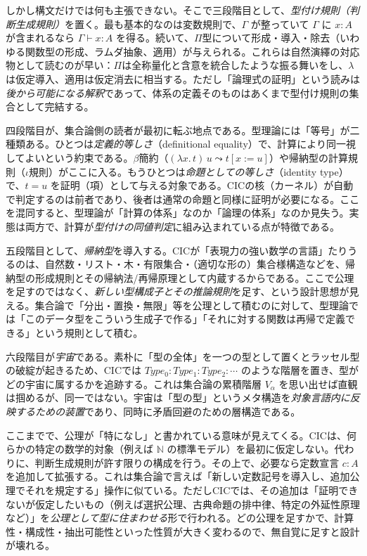 \documentclass[a4paper,12pt]{bxjsbook}
\newlength{\customindent}
\newenvironment{body}{
  \par
  \begingroup
  \setlength{\leftskip}{\customindent}
  \setlength{\rightskip}{0pt}
  \setlength{\parindent}{1em}
  \setlength{\displayindent}{\customindent}
  \setlength{\displaywidth}{\dimexpr\linewidth-\customindent\relax}
}{
  \par
  \endgroup
}
\theoremstyle{theorem}
\begin{document}
\begin{body}
        \indent しかし構文だけでは何も主張できない。そこで三段階目として、\emph{型付け規則（判断生成規則）}を置く。最も基本的なのは変数規則で、$\Gamma$ が整っていて $\Gamma$ に $x:A$ が含まれるなら $\Gamma\vdash x:A$ を得る。続いて、$\Pi$型について形成・導入・除去（いわゆる関数型の形成、ラムダ抽象、適用）が与えられる。これらは自然演繹の対応物として読むのが早い：$\Pi$は全称量化と含意を統合したような振る舞いをし、$\lambda$は仮定導入、適用は仮定消去に相当する。ただし「論理式の証明」という読みは\emph{後から可能になる解釈}であって、体系の定義そのものはあくまで型付け規則の集合として完結する。

        \indent 四段階目が、集合論側の読者が最初に転ぶ地点である。型理論には「等号」が二種類ある。ひとつは\emph{定義的等しさ}（definitional equality）で、計算により同一視してよいという約束である。$\beta$簡約（$(\lambda x.\,t)\,u \leadsto t[x:=u]$）や帰納型の計算規則（$\iota$規則）がここに入る。もうひとつは\emph{命題としての等しさ}（identity type）で、$t=u$ を証明（項）として与える対象である。CICの核（カーネル）が自動で判定するのは前者であり、後者は通常の命題と同様に証明が必要になる。ここを混同すると、型理論が「計算の体系」なのか「論理の体系」なのか見失う。実態は両方で、計算が\emph{型付けの同値判定}に組み込まれている点が特徴である。

        \indent 五段階目として、\emph{帰納型}を導入する。CICが「表現力の強い数学の言語」たりうるのは、自然数・リスト・木・有限集合・（適切な形の）集合様構造などを、帰納型の形成規則とその帰納法/再帰原理として内蔵するからである。ここで公理を足すのではなく、\emph{新しい型構成子とその推論規則}を足す、という設計思想が見える。集合論で「分出・置換・無限」等を公理として積むのに対して、型理論では「このデータ型をこういう生成子で作る」「それに対する関数は再帰で定義できる」という規則として積む。

        \indent 六段階目が\emph{宇宙}である。素朴に「型の全体」を一つの型として置くとラッセル型の破綻が起きるため、CICでは $Type_0 : Type_1 : Type_2 : \cdots$ のような階層を置き、型がどの宇宙に属するかを追跡する。これは集合論の累積階層 $V_\alpha$ を思い出せば直観は掴めるが、同一ではない。宇宙は「型の型」というメタ構造を\emph{対象言語内に反映するための装置}であり、同時に矛盾回避のための層構造である。

        \indent ここまでで、公理が「特になし」と書かれている意味が見えてくる。CICは、何らかの特定の数学的対象（例えば $\mathbb{N}$ の標準モデル）を最初に仮定しない。代わりに、判断生成規則が許す限りの構成を行う。その上で、必要なら定数宣言 $c:A$ を追加して拡張する。これは集合論で言えば「新しい定数記号を導入し、追加公理でそれを規定する」操作に似ている。ただしCICでは、その追加は「証明できないが仮定したいもの（例えば選択公理、古典命題の排中律、特定の外延性原理など）」を\emph{公理として型に住まわせる}形で行われる。どの公理を足すかで、計算性・構成性・抽出可能性といった性質が大きく変わるので、無自覚に足すと設計が壊れる。


\end{body}
\end{document}
